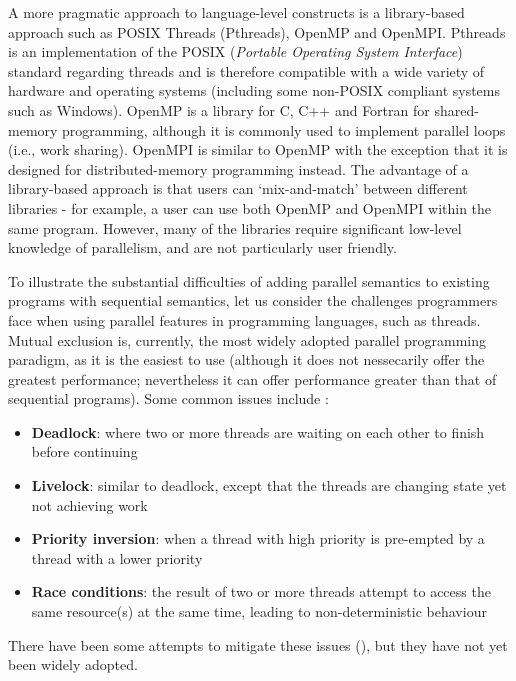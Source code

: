 A more pragmatic approach to language-level constructs is a library-based approach such as POSIX Threads (Pthreads), OpenMP and OpenMPI. Pthreads is an implementation of the POSIX (\textit{Portable Operating System Interface}) standard regarding threads and is therefore compatible with a wide variety of hardware and operating systems (including some non-POSIX compliant systems such as Windows). OpenMP is a library for C, C++ and Fortran for shared-memory programming, although it is commonly used to implement parallel loops (i.e., work sharing). OpenMPI is similar to OpenMP with the exception that it is designed for distributed-memory programming instead. The advantage of a library-based approach is that users can `mix-and-match' between different libraries - for example, a user can use both OpenMP and OpenMPI within the same program. However, many of the libraries require significant low-level knowledge of parallelism, and are not particularly user friendly.

To illustrate the substantial difficulties of adding parallel semantics to existing programs with sequential semantics, let us consider the challenges programmers face when using parallel features in programming languages, such as threads. Mutual exclusion is, currently, the most widely adopted parallel programming paradigm, as it is the easiest to use (although it does not nessecarily offer the greatest performance; nevertheless it can offer performance greater than that of sequential programs). Some common issues include \citep{Fraser04,Herlihy1993,ppls}:

\begin{itemize} \label{lst:parallelhard}
	\item \textbf{Deadlock}: where two or more threads are waiting on each other to finish before continuing 
	
	\item \textbf{Livelock}: similar to deadlock, except that the threads are changing state yet not achieving work
	
	\item \textbf{Priority inversion}: when a thread with high priority is pre-empted by a thread with a lower priority
	
	\item \textbf{Race conditions}: the result of two or more threads attempt to access the same resource(s) at the same time, leading to non-deterministic behaviour
\end{itemize}

There have been some attempts to mitigate these issues (\eg \citet{Liu2011}), but they have not yet been widely adopted.

